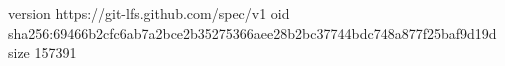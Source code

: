 version https://git-lfs.github.com/spec/v1
oid sha256:69466b2cfc6ab7a2bce2b35275366aee28b2bc37744bdc748a877f25baf9d19d
size 157391
